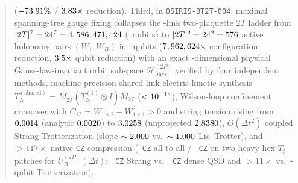 \documentclass[aps,prx,twocolumn,superscriptaddress,nofootinbib]{revtex4-2}
\begin{document}
\begin{abstract}
($-\rfsSoftFezSlopeRedPct$ / $\rfsSoftFezSlopeFactor$ reduction). Third, in \texttt{OSIRIS-BT2T-004}, maximal spanning-tree gauge fixing collapses the \rfsBtUnfixedLinks-link two-plaquette $2T$ ladder from $|2T|^7 = 24^7 = \rfsBtUnfixedConfigs$ (\rfsBtUnfixedQubits\ qubits) to $|2T|^2 = 24^2 = \rfsBtActiveConfigs$ active holonomy pairs $(W_1, W_B)$ in \rfsBtGaugeFixedQubits\ qubits ($\rfsBtConfigReduction$ configuration reduction, $\rfsBtQubitReduction$ qubit reduction) with an exact \rfsBtPhysSubspaceDim-dimensional physical Gauss-law-invariant orbit subspace $\mathcal{H}_{\mathrm{phys}}^{(2P)}$ verified by four independent methods, machine-precision shared-link electric kinetic synthesis $T_E^{(\mathrm{shared})} = M_{2T}^\dagger (T_E^{(1)} \otimes I) M_{2T}$ ($< \rfsBtMachinePrecBound$), Wilson-loop confinement crossover with $C_{12} = W_{1\times 2} - W_{1\times 1}^2 > 0$ and string tension rising from $\rfsBtSigmaEffGZeroTwoFive$ (analytic $\rfsBtSigmaAnalyticGZeroTwoFive$) to $\rfsBtSigmaEffGFour$ (unprojected $\rfsBtSigmaUnprojGFour$), $O(\Delta t^2)$ coupled Strang Trotterization (slope $\sim \rfsBtStrangSlopeTarget$ vs.\ $\sim \rfsBtLieSlopeTarget$ Lie--Trotter), and $> 117\times$ native \texttt{CZ} compression (\rfsBtCzUbAllToAll\ \texttt{CZ} all-to-all / \rfsBtCzUbHeavyHex\ \texttt{CZ} on two heavy-hex $T_5$ patches for $U_B^{(2P)}(\Delta t)$; \rfsBtCzStrangAllToAll\ \texttt{CZ} Strang vs.\ \rfsBtCzDenseTenQQsd\ \texttt{CZ} dense QSD and $> 11\times$ vs.\ \rfsBtUnfixedQubits-qubit Trotterization).
\end{abstract}

\maketitle
\end{document}
